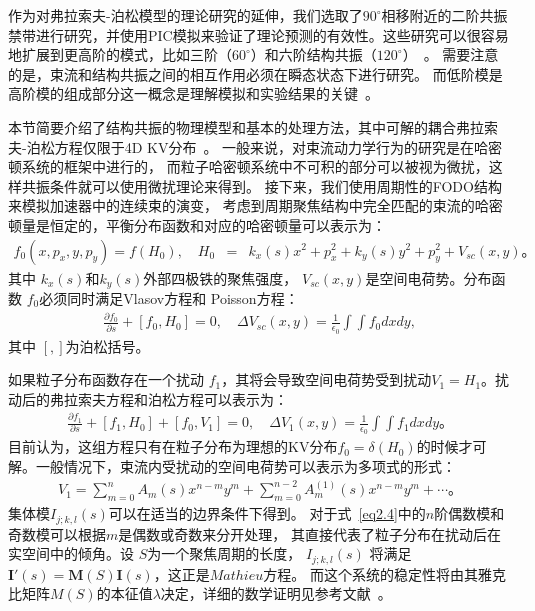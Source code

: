 作为对弗拉索夫-泊松模型的理论研究的延伸，我们选取了$90^{\circ}$相移附近的二阶共振禁带进行研究，并使用PIC模拟来验证了理论预测的有效性。这些研究可以很容易地扩展到更高阶的模式，比如三阶（$60^{\circ}$）和六阶结构共振（$120^{\circ}$）~\cite{36,40}。
需要注意的是，束流和结构共振之间的相互作用必须在瞬态状态下进行研究。
而低阶模是高阶模的组成部分这一概念是理解模拟和实验结果的关键~\cite{groening2009experimental,33}。

本节简要介绍了结构共振的物理模型和基本的处理方法，其中可解的耦合弗拉索夫-泊松方程仅限于4D KV分布~\cite{20}。
一般来说，对束流动力学行为的研究是在哈密顿系统的框架中进行的，
而粒子哈密顿系统中不可积的部分可以被视为微扰，这样共振条件就可以使用微扰理论来得到。
接下来，我们使用周期性的FODO结构来模拟加速器中的连续束的演变， 考虑到周期聚焦结构中完全匹配的束流的哈密顿量是恒定的，平衡分布函数和对应的哈密顿量可以表示为：
\begin{eqnarray}\label{eq2.1}
  f_0(x,p_x,y,p_y) =f(H_0),  \quad  H_0&=&k_x(s)x^2+p_x^2+k_y(s)y^2+p_y^2+V_{sc}(x,y)\text{。}
\end{eqnarray}
其中 $k_x(s)$和$k_y(s)$外部四极铁的聚焦强度， $V_{sc}(x,y)$是空间电荷势。分布函数 $f_0$必须同时满足Vlasov方程和 Poisson方程：
\begin{eqnarray}\label{eq2.2}
\frac{\partial f_0}{\partial s} + [f_0,H_0]=0,   \quad \Delta V_{sc}(x,y)  = \frac{1}{\epsilon_0}  \int \int f_0 dxdy,
\end{eqnarray}
其中 $[,]$为泊松括号。

如果粒子分布函数存在一个扰动 $f_1$，其将会导致空间电荷势受到扰动$V_1=H_1$。扰动后的弗拉索夫方程和泊松方程可以表示为：
\begin{eqnarray}\label{eq2.3}
\frac{\partial f_1}{\partial s} + [f_1,H_0] +  [f_0,V_1]=0,   \quad \Delta V_1(x,y)  = \frac{1}{\epsilon_0}  \int \int f_1 dxdy\text{。}
\end{eqnarray}
目前认为，这组方程只有在粒子分布为理想的KV分布$f_0=\delta(H_0)$的时候才可解。一般情况下，束流内受扰动的空间电荷势可以表示为多项式的形式：
\begin{eqnarray}\label{eq2.4}
V_1=\sum_{m=0}^{n}A_m(s)x^{n-m}y^m +\sum_{m=0}^{n-2}A_m^{(1)}(s)x^{n-m}y^m+\cdots\text{。}
\end{eqnarray}
集体模$I_{j;k,l}(s)$可以在适当的边界条件下得到。
对于式~\eqref{eq2.4}中的$n$阶偶数模和奇数模可以根据$m$是偶数或奇数来分开处理，
其直接代表了粒子分布在扰动后在实空间中的倾角。设 $S$为一个聚焦周期的长度，
$I_{j;k,l}(s)$ 将满足$\mathbf{I}'(s) = \mathbf{M}(S)\mathbf{I}(s)$，这正是$Mathieu$方程。
而这个系统的稳定性将由其雅克比矩阵$M(S)$的本征值$\lambda$决定，详细的数学证明见参考文献~\cite{11,li2018structure,18,19}。

